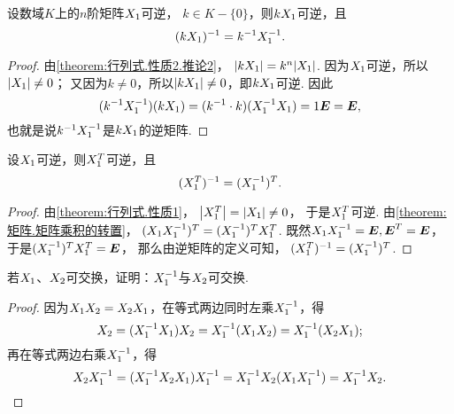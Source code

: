 \begin{property}\label{theorem:逆矩阵.数与矩阵乘积的逆}
设数域\(K\)上的\(n\)阶矩阵\(X_1\)可逆，
\(k \in K-\{0\}\)，则\(kX_1\)可逆，且
\begin{equation}
	(kX_1)^{-1}=k^{-1}X_1^{-1}.
\end{equation}
\begin{proof}
由\cref{theorem:行列式.性质2.推论2}，
\(\abs{kX_1} = k^n\abs{X_1}\).
因为\(X_1\)可逆，所以\(\abs{X_1}\neq0\)；
又因为\(k\neq0\)，所以\(\abs{kX_1}\neq0\)，即\(kX_1\)可逆.
因此\[
	(k^{-1}X_1^{-1})(kX_1)
	= (k^{-1} \cdot k)(X_1^{-1}X_1)
	= 1 \boldsymbol{E} = \boldsymbol{E},
\]
也就是说\(k^{-1}X_1^{-1}\)是\(kX_1\)的逆矩阵.
\end{proof}
\end{property}

\begin{property}\label{theorem:逆矩阵.转置矩阵的逆与逆矩阵的转置}
设\(X_1\)可逆，则\(X_1^T\)可逆，且\begin{equation}
	(X_1^T)^{-1}=(X_1^{-1})^T.
\end{equation}
\begin{proof}
由\cref{theorem:行列式.性质1}，
\(\abs{X_1^T}=\abs{X_1}\neq0\)，
于是\(X_1^T\)可逆.
由\cref{theorem:矩阵.矩阵乘积的转置}，
\((X_1 X_1^{-1})^T = (X_1^{-1})^T X_1^T\).
既然\(X_1 X_1^{-1} = \boldsymbol{E}, \boldsymbol{E}^T = \boldsymbol{E}\)，
于是\((X_1^{-1})^T X_1^T = \boldsymbol{E}\)，
那么由逆矩阵的定义可知，
\((X_1^T)^{-1}=(X_1^{-1})^T\).
\end{proof}
\end{property}

\begin{example}
若\(X_1\)、\(X_2\)可交换，证明：\(X_1^{-1}\)与\(X_2\)可交换.
\begin{proof}
因为\(X_1X_2 = X_2X_1\)，在等式两边同时左乘\(X_1^{-1}\)，得\[
X_2 = (X_1^{-1}X_1)X_2 = X_1^{-1}(X_1X_2) = X_1^{-1}(X_2X_1);
\]再在等式两边右乘\(X_1^{-1}\)，得\[
X_2X_1^{-1} = (X_1^{-1}X_2X_1)X_1^{-1} = X_1^{-1}X_2(X_1X_1^{-1}) = X_1^{-1}X_2.
\qedhere
\]
\end{proof}
\end{example}

